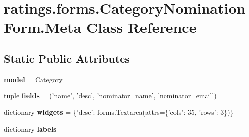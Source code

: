 \hypertarget{classratings_1_1forms_1_1CategoryNominationForm_1_1Meta}{\section{ratings.\-forms.\-Category\-Nomination\-Form.\-Meta Class Reference}
\label{classratings_1_1forms_1_1CategoryNominationForm_1_1Meta}
}
\subsection*{Static Public Attributes}
\begin{DoxyCompactItemize}
\item 
\hypertarget{classratings_1_1forms_1_1CategoryNominationForm_1_1Meta_ab88933a7fa8bc152829c9ab99a4e3207}{{\bfseries model} = Category}\label{classratings_1_1forms_1_1CategoryNominationForm_1_1Meta_ab88933a7fa8bc152829c9ab99a4e3207}

\item 
\hypertarget{classratings_1_1forms_1_1CategoryNominationForm_1_1Meta_ac157756ae5bc45b0faa0c9a7da02e33d}{tuple {\bfseries fields} = ('name', 'desc', 'nominator\-\_\-name', 'nominator\-\_\-email')}\label{classratings_1_1forms_1_1CategoryNominationForm_1_1Meta_ac157756ae5bc45b0faa0c9a7da02e33d}

\item 
\hypertarget{classratings_1_1forms_1_1CategoryNominationForm_1_1Meta_a108a54d1ed5a5e3073fdf8892b3707b2}{dictionary {\bfseries widgets} = \{'desc'\-: forms.\-Textarea(attrs=\{'cols'\-: 35, 'rows'\-: 3\})\}}\label{classratings_1_1forms_1_1CategoryNominationForm_1_1Meta_a108a54d1ed5a5e3073fdf8892b3707b2}

\item 
dictionary {\bfseries labels}
\end{DoxyCompactItemize}


